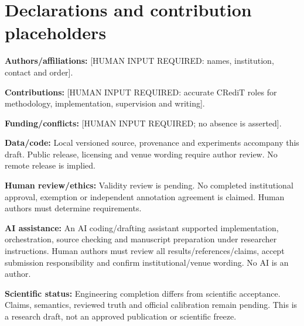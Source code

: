\section{Declarations and contribution placeholders}
\textbf{Authors/affiliations:} [HUMAN INPUT REQUIRED: names, institution, contact and order].

\textbf{Contributions:} [HUMAN INPUT REQUIRED: accurate CRediT roles for methodology, implementation, supervision and writing].

\textbf{Funding/conflicts:} [HUMAN INPUT REQUIRED; no absence is asserted].

\textbf{Data/code:} Local versioned source, provenance and experiments accompany this draft. Public release, licensing and venue wording require author review. No remote release is implied.

\textbf{Human review/ethics:} Validity review is pending. No completed institutional approval, exemption or independent annotation agreement is claimed. Human authors must determine requirements.

\textbf{AI assistance:} An AI coding/drafting assistant supported implementation, orchestration, source checking and manuscript preparation under researcher instructions. Human authors must review all results/references/claims, accept submission responsibility and confirm institutional/venue wording. No AI is an author.

\textbf{Scientific status:} Engineering completion differs from scientific acceptance. Claims, semantics, reviewed truth and official calibration remain pending. This is a research draft, not an approved publication or scientific freeze.
